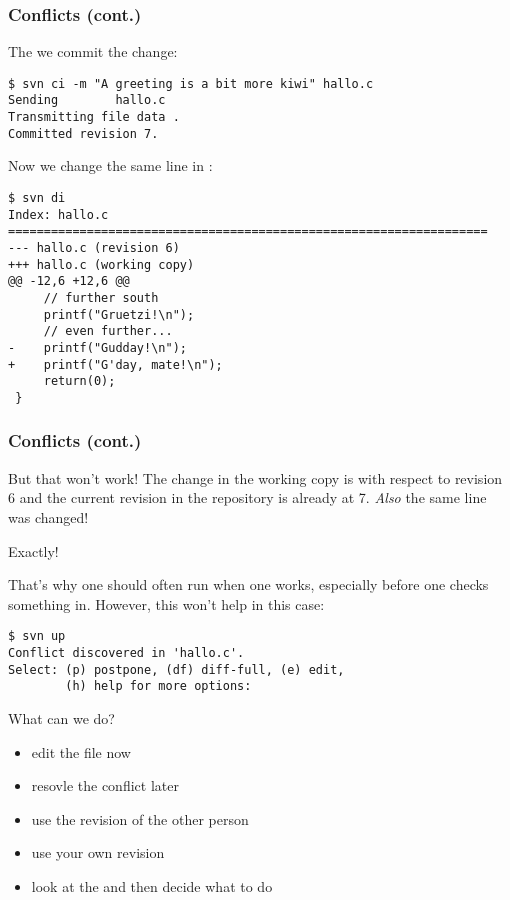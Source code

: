 \begin{frame}[fragile]
    \frametitle{Conflicts (cont.)}
    \linuxframe

    The we commit the change:
\begin{lstlisting}
$ svn ci -m "A greeting is a bit more kiwi" hallo.c
Sending        hallo.c
Transmitting file data .
Committed revision 7.
\end{lstlisting}

Now we change the same line in :
\begin{lstlisting}[basicstyle=\tiny\ttfamily\color{black}]
$ svn di
Index: hallo.c
===================================================================
--- hallo.c (revision 6)
+++ hallo.c (working copy)
@@ -12,6 +12,6 @@
     // further south
     printf("Gruetzi!\n");
     // even further...
-    printf("Gudday!\n");
+    printf("G'day, mate!\n");
     return(0);
 }
\end{lstlisting}
\end{frame}

\begin{frame}[fragile]
    \frametitle{Conflicts (cont.)}
    \linuxframe

But that won't work!  The change in the working copy is with respect to
revision 6 and the current revision in the repository is already at 7.
\emph{Also} the same line was changed!

Exactly!

That's why one should often run  when one works,
especially before one checks something in.  However, this won't help in this
case:

\begin{lstlisting}[basicstyle=\tiny\ttfamily\color{black}]
$ svn up
Conflict discovered in 'hallo.c'.
Select: (p) postpone, (df) diff-full, (e) edit,
        (h) help for more options: 
\end{lstlisting}

What can we do?
    \begin{itemize}
        \item edit the file now
        \item resovle the conflict later
        \item use the revision of the other person
        \item use your own revision
        \item look at the  and then decide what to do
    \end{itemize}
\end{frame}

